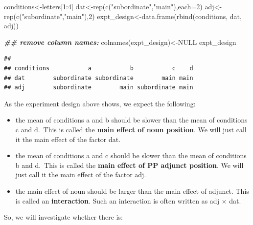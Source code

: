 \documentclass[
  12pt,
]{krantz}
\newenvironment{Shaded}{\begin{snugshade}}{\end{snugshade}}
\newcommand{\AttributeTok}[1]{\textcolor[rgb]{0.77,0.63,0.00}{#1}}
\newcommand{\ConstantTok}[1]{\textcolor[rgb]{0.00,0.00,0.00}{#1}}
\newcommand{\DecValTok}[1]{\textcolor[rgb]{0.00,0.00,0.81}{#1}}
\newcommand{\DocumentationTok}[1]{\textcolor[rgb]{0.56,0.35,0.01}{\textbf{\textit{#1}}}}
\newcommand{\FunctionTok}[1]{\textcolor[rgb]{0.00,0.00,0.00}{#1}}
\newcommand{\NormalTok}[1]{#1}
\newcommand{\OtherTok}[1]{\textcolor[rgb]{0.56,0.35,0.01}{#1}}
\newcommand{\SpecialCharTok}[1]{\textcolor[rgb]{0.00,0.00,0.00}{#1}}
\newcommand{\StringTok}[1]{\textcolor[rgb]{0.31,0.60,0.02}{#1}}
\providecommand{\tightlist}{%
  \setlength{\itemsep}{0pt}\setlength{\parskip}{0pt}}
\theoremstyle{definition}
\theoremstyle{definition}
\theoremstyle{definition}
\theoremstyle{definition}
\theoremstyle{remark}
\begin{document}
\begin{Shaded}
\begin{Highlighting}[]
\NormalTok{conditions}\OtherTok{\textless{}{-}}\NormalTok{letters[}\DecValTok{1}\SpecialCharTok{:}\DecValTok{4}\NormalTok{]}
\NormalTok{dat}\OtherTok{\textless{}{-}}\FunctionTok{rep}\NormalTok{(}\FunctionTok{c}\NormalTok{(}\StringTok{"subordinate"}\NormalTok{,}\StringTok{"main"}\NormalTok{),}\AttributeTok{each=}\DecValTok{2}\NormalTok{)}
\NormalTok{adj}\OtherTok{\textless{}{-}}\FunctionTok{rep}\NormalTok{(}\FunctionTok{c}\NormalTok{(}\StringTok{"subordinate"}\NormalTok{,}\StringTok{"main"}\NormalTok{),}\DecValTok{2}\NormalTok{)}
\NormalTok{expt\_design}\OtherTok{\textless{}{-}}\FunctionTok{data.frame}\NormalTok{(}\FunctionTok{rbind}\NormalTok{(conditions,}
\NormalTok{      dat,}
\NormalTok{      adj))}

\DocumentationTok{\#\# remove column names:}
\FunctionTok{colnames}\NormalTok{(expt\_design)}\OtherTok{\textless{}{-}}\ConstantTok{NULL}
\NormalTok{expt\_design}
\end{Highlighting}
\end{Shaded}

\begin{verbatim}
##                                                    
## conditions           a           b           c    d
## dat        subordinate subordinate        main main
## adj        subordinate        main subordinate main
\end{verbatim}

As the experiment design above shows, we expect the following:

\begin{itemize}
\tightlist
\item
  the mean of conditions a and b should be slower than the mean of conditions c and d.~This is called the \textbf{main effect of noun position}. We will just call it the main effect of the factor dat.
\item
  the mean of conditions a and c should be slower than the mean of conditions b and d.~This is called the \textbf{main effect of PP adjunct position}. We will just call it the main effect of the factor adj.
\item
  the main effect of noun should be larger than the main effect of adjunct. This is called an \textbf{interaction}. Such an interaction is often written as adj \(\times\) dat.
\end{itemize}

So, we will investigate whether there is:
\end{document}
